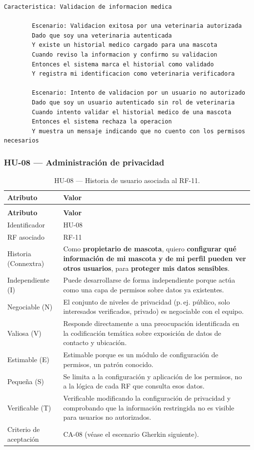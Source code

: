 \documentclass[journal,onecolumn]{IEEEtran}
\makeatletter
\newenvironment{atributos}[2]{%
	\small
	\begin{longtable}{@{}>{\raggedright\arraybackslash}p{4.2cm} >{\raggedright\arraybackslash}p{11.2cm}@{}}
		\caption{#2}\label{tab:#1}\\
		\toprule
		\textbf{Atributo} & \textbf{Valor} \\
		\midrule
		\endfirsthead
		\multicolumn{2}{@{}l}{\small\itshape (continuación)}\\
		\toprule
		\textbf{Atributo} & \textbf{Valor} \\
		\midrule
		\endhead
		\bottomrule
		\endlastfoot
	}{%
	\end{longtable}
	\normalsize
}
\makeatother
\begin{document}
	\begin{lstlisting}[style=gherkin,caption={CA-07 --- Escenario de aceptación de la historia HU-07.},label={lst:ca07}]
		Caracteristica: Validacion de informacion medica
		
		Escenario: Validacion exitosa por una veterinaria autorizada
		Dado que soy una veterinaria autenticada
		Y existe un historial medico cargado para una mascota
		Cuando reviso la informacion y confirmo su validacion
		Entonces el sistema marca el historial como validado
		Y registra mi identificacion como veterinaria verificadora
		
		Escenario: Intento de validacion por un usuario no autorizado
		Dado que soy un usuario autenticado sin rol de veterinaria
		Cuando intento validar el historial medico de una mascota
		Entonces el sistema rechaza la operacion
		Y muestra un mensaje indicando que no cuento con los permisos necesarios
	\end{lstlisting}
	
	\subsubsection{HU-08 --- Administración de privacidad}
	
	\begin{atributos}{HU-08}{HU-08 --- Historia de usuario asociada al RF-11.}
		Identificador & HU-08 \\
		RF asociado & RF-11 \\
		Historia (Connextra) & Como \textbf{propietario de mascota}, quiero \textbf{configurar qué información de mi mascota y de mi perfil pueden ver otros usuarios}, para \textbf{proteger mis datos sensibles}. \\
		Independiente (I) & Puede desarrollarse de forma independiente porque actúa como una capa de permisos sobre datos ya existentes. \\
		Negociable (N) & El conjunto de niveles de privacidad (p.\,ej. público, solo interesados verificados, privado) es negociable con el equipo. \\
		Valiosa (V) & Responde directamente a una preocupación identificada en la codificación temática sobre exposición de datos de contacto y ubicación. \\
		Estimable (E) & Estimable porque es un módulo de configuración de permisos, un patrón conocido. \\
		Pequeña (S) & Se limita a la configuración y aplicación de los permisos, no a la lógica de cada RF que consulta esos datos. \\
		Verificable (T) & Verificable modificando la configuración de privacidad y comprobando que la información restringida no es visible para usuarios no autorizados. \\
		Criterio de aceptación & CA-08 (véase el escenario Gherkin siguiente). \\
	\end{atributos}
	
\end{document}
